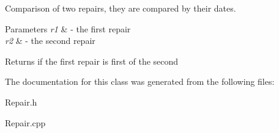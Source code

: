 Comparison of two repairs, they are compared by their dates. 


\begin{DoxyParams}{Parameters}
{\em r1} & -\/ the first repair \\
\hline
{\em r2} & -\/ the second repair \\
\hline
\end{DoxyParams}
\begin{DoxyReturn}{Returns}
if the first repair is first of the second 
\end{DoxyReturn}


The documentation for this class was generated from the following files\+:\begin{DoxyCompactItemize}
\item 
Repair.\+h\item 
Repair.\+cpp\end{DoxyCompactItemize}
